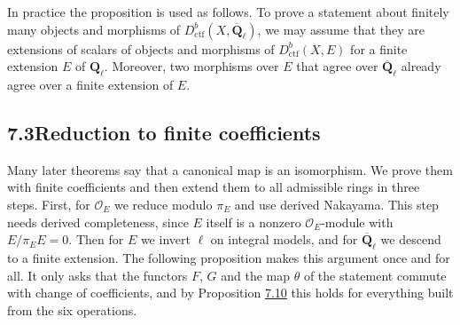 \documentclass[11pt]{article}
\begin{document}
\label{bp31}%
In practice the proposition is used as follows. To prove a statement about finitely many objects and morphisms of \(D^b_{\mathrm{ctf}}(X,\overline{\mathbf Q}_\ell)\), we may assume that they are extensions of scalars of objects and morphisms of \(D^b_{\mathrm{ctf}}(X,E)\) for a finite extension \(E\) of \(\mathbf Q_\ell\). Moreover, two morphisms over \(E\) that agree over \(\overline{\mathbf Q}_\ell\) already agree over a finite extension of \(E\).


\subsection*{\texorpdfstring{7.3\quad Reduction to finite coefficients}{7.3 Reduction to finite coefficients}}
\label{bp32}%
\label{bp33}%
Many later theorems say that a canonical map is an isomorphism. We prove them with finite coefficients and then extend them to all admissible rings in three steps. First, for \(\mathcal O_E\) we reduce modulo \(\pi_E\) and use derived Nakayama. This step needs derived completeness, since \(E\) itself is a nonzero \(\mathcal O_E\)-module with \(E/\pi_E E=0\). Then for \(E\) we invert \(\ell\) on integral models, and for \(\overline{\mathbf Q}_\ell\) we descend to a finite extension. The following proposition makes this argument once and for all. It only asks that the functors \(F\), \(G\) and the map \(\theta\) of the statement commute with change of coefficients, and by Proposition \hyperref[bp26]{7.10} this holds for everything built from the six operations.
\end{document}
